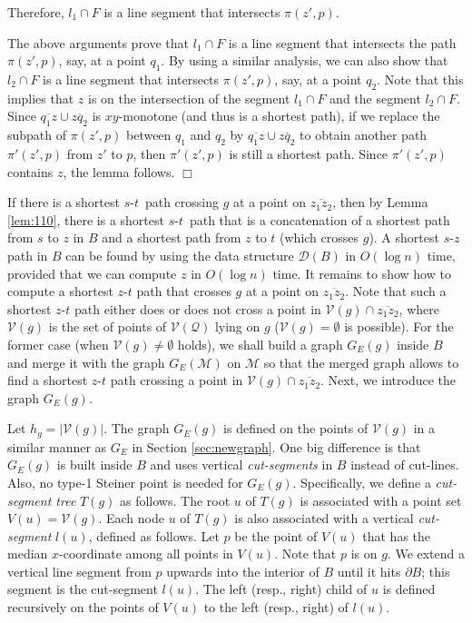\documentclass[english,runningheads,11pt]{llncs}
\def\calM{\mathcal{M}}
\def\calQ{\mathcal{Q}}
\def\calD{\mathcal{D}}
\def\calV{\mathcal{V}}
\def\st{$s$-$t$}
\newenvironment{proof}{\noindent {\textbf{Proof:}}\rm}{\hfill $\Box$\rm}
\begin{document}
\begin{proof}
\begin{enumerate}
\begin{enumerate}
Therefore, $l_1\cap F$ is a line segment that intersects $\pi(z',p)$.
\end{enumerate}
\end{enumerate}

The above arguments prove that $l_1\cap F$ is a line segment that intersects the path $\pi(z',p)$, say, at a point $q_1$. By using a
similar analysis, we can also show that $l_2\cap F$ is a line segment that intersects $\pi(z',p)$, say, at a point $q_2$. Note that this implies that $z$ is on the intersection of the segment $l_1\cap F$ and the segment $l_2\cap F$.
Since $\overline{q_1z}\cup \overline{zq_2}$ is $xy$-monotone (and thus is a shortest path),
if we replace the subpath of $\pi(z',p)$ between $q_1$ and $q_2$
by $\overline{q_1z}\cup \overline{zq_2}$ to obtain another path
$\pi'(z',p)$ from $z'$ to $p$, then $\pi'(z',p)$ is still a shortest path. Since $\pi'(z',p)$ contains $z$, the lemma follows.
\end{proof}

If there is a shortest \st\ path crossing $g$ at a point on $\overline{z_1z_2}$,
then by Lemma \ref{lem:110}, there is a shortest \st\ path that is a
concatenation of a shortest path from $s$ to $z$ in $B$ and a
shortest path from $z$ to $t$ (which crosses $g$). A shortest $s$-$z$ path in
$B$ can be found by using the data structure $\calD(B)$ in $O(\log n)$ time,
provided that we can compute $z$ in $O(\log n)$
time. It remains to show how to compute a shortest $z$-$t$ path that
crosses $g$ at a point on $\overline{z_1z_2}$. Note that
such a shortest $z$-$t$ path either does or does not cross a point in
$\calV(g)\cap \overline{z_1z_2}$, where $\calV(g)$ is the set of
points of $\calV(\calQ)$ lying on $g$
($\calV(g)=\emptyset$ is possible).
For the former case (when $\calV(g)\neq \emptyset$ holds), we shall
build a graph $G_E(g)$ inside $B$ and merge it with the graph $G_E(\calM)$ on $\calM$ so that
the merged graph allows to find a shortest $z$-$t$ path crossing a point in
$\calV(g)\cap \overline{z_1z_2}$. Next, we introduce the graph $G_E(g)$.

Let $h_g=|\calV(g)|$. The graph $G_E(g)$ is defined on the points
of $\calV(g)$ in a similar manner as $G_E$ in Section \ref{sec:newgraph}. One big difference is that $G_E(g)$ is built inside $B$ and uses vertical {\em cut-segments} in $B$
instead of cut-lines. Also, no type-1 Steiner point is needed for $G_E(g)$.
Specifically, we define a {\em cut-segment tree} $T(g)$ as follows. The root $u$ of $T(g)$ is associated with a point set $V(u)=\calV(g)$. Each node $u$ of $T(g)$ is also associated with a vertical {\em cut-segment}
$l(u)$, defined as follows. Let $p$ be the point of $V(u)$ that has the median $x$-coordinate among all
points in $V(u)$. Note that $p$ is on $g$. We extend a vertical line
segment from $p$ upwards into the interior of $B$ until it hits $\partial B$; this segment is the cut-segment $l(u)$.
The left (resp., right) child of $u$ is defined recursively on the points of $V(u)$ to the left (resp., right) of $l(u)$.
\end{document}
